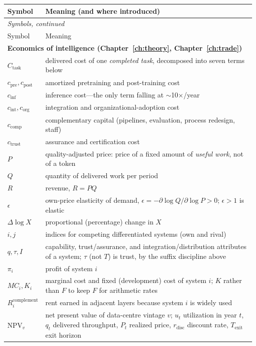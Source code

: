 \begin{longtable}{p{26mm}p{112mm}}
\toprule
Symbol & Meaning (and where introduced) \\
\midrule
\endfirsthead
\multicolumn{2}{l}{\footnotesize\emph{Symbols, continued}} \\
\toprule
Symbol & Meaning \\
\midrule
\endhead
\multicolumn{2}{l}{\textbf{Economics of intelligence (Chapter~\ref{ch:theory}, Chapter~\ref{ch:trade})}} \\
\midrule
$C_{\text{task}}$ & delivered cost of one \emph{completed task}, decomposed into seven terms below \\
$c_{\text{pre}}, c_{\text{post}}$ & amortized pretraining and post-training cost \\
$c_{\text{inf}}$ & inference cost---the only term falling at $\sim$10$\times$/year \\
$c_{\text{int}}, c_{\text{org}}$ & integration and organizational-adoption cost \\
$c_{\text{comp}}$ & complementary capital (pipelines, evaluation, process redesign, staff) \\
$c_{\text{trust}}$ & assurance and certification cost \\
$P$ & quality-adjusted price: price of a fixed amount of \emph{useful work}, not of a token \\
$Q$ & quantity of delivered work per period \\
$R$ & revenue, $R = PQ$ \\
$\epsilon$ & own-price elasticity of demand, $\epsilon = -\partial\log Q/\partial\log P > 0$; $\epsilon>1$ is elastic \\
$\Delta \log X$ & proportional (percentage) change in $X$ \\
$i, j$ & indices for competing differentiated systems (own and rival) \\
$q, \tau, I$ & capability, trust/assurance, and integration/distribution attributes of a system; $\tau$ (not $T$) is trust, by the suffix discipline above \\
$\pi_i$ & profit of system $i$ \\
$MC_i, K_i$ & marginal cost and fixed (development) cost of system $i$; $K$ rather than $F$ to keep $F$ for arithmetic rates \\
$R_i^{\mathrm{complement}}$ & rent earned in adjacent layers because system $i$ is widely used \\
$\mathrm{NPV}_v$ & net present value of data-centre vintage $v$; $u_t$ utilization in year $t$, $q_t$ delivered throughput, $P_t$ realized price, $r_{\mathrm{disc}}$ discount rate, $T_{\mathrm{exit}}$ exit horizon \\

\end{longtable}

